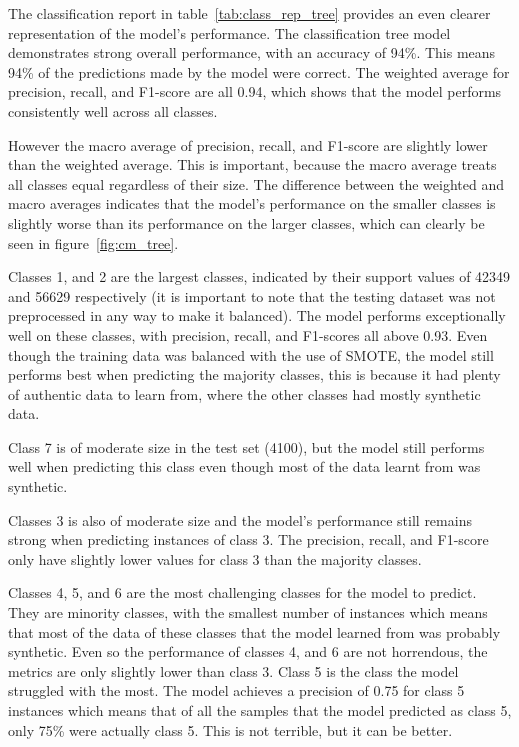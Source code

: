 \documentclass[conference]{IEEEtran}
\begin{document}
The classification report in table~\ref{tab:class_rep_tree} provides an even clearer representation of the model's performance. The classification tree model demonstrates strong overall performance, with an accuracy of 94\%. This means 94\% of the predictions made by the model were correct. The weighted average for precision, recall, and F1-score are all 0.94, which shows that the model performs consistently well across all classes.

However the macro average of precision, recall, and F1-score are slightly lower than the weighted average. This is important, because the macro average treats all classes equal regardless of their size. The difference between the weighted and macro averages indicates that the model's performance on the smaller classes is slightly worse than its performance on the larger classes, which can clearly be seen in figure~\ref{fig:cm_tree}.

Classes 1, and 2 are the largest classes, indicated by their support values of 42349 and 56629 respectively (it is important to note that the testing dataset was not preprocessed in any way to make it balanced). The model performs exceptionally well on these classes, with precision, recall, and F1-scores all above 0.93. Even though the training data was balanced with the use of SMOTE, the model still performs best when predicting the majority classes, this is because it had plenty of authentic data to learn from, where the other classes had mostly synthetic data.

Class 7 is of moderate size in the test set (4100), but the model still performs well when predicting this class even though most of the data learnt from was synthetic.

Classes 3 is also of moderate size and the model's performance still remains strong when predicting instances of class 3. The precision, recall, and F1-score only have slightly lower values for class 3 than the majority classes.

Classes 4, 5, and 6 are the most challenging classes for the model to predict. They are minority classes, with the smallest number of instances which means that most of the data of these classes that the model learned from was probably synthetic. Even so the performance of classes 4, and 6 are not horrendous, the metrics are only slightly lower than class 3. Class 5 is the class the model struggled with the most. The model achieves a precision of 0.75 for class 5 instances which means that of all the samples that the model predicted as class 5, only 75\% were actually class 5. This is not terrible, but it can be better.
\end{document}
